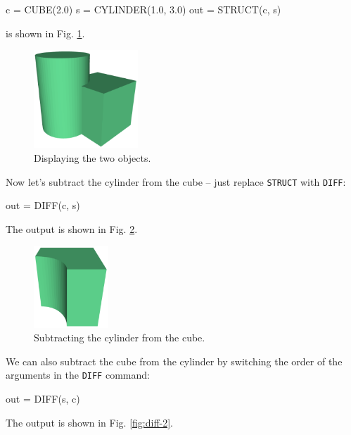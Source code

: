 \begin{bluecode}
c = CUBE(2.0)
s = CYLINDER(1.0, 3.0)
out = STRUCT(c, s) 
\end{bluecode}
is shown in Fig. \ref{fig:diff-0}.

\begin{figure}[!ht]
\begin{center}
\includegraphics[width=0.35\textwidth]{img/diff-0.png}
\end{center}
\vspace{-4mm}
\caption{Displaying the two objects.}
\label{fig:diff-0}
\end{figure}
\noindent
Now let's subtract the cylinder from the cube -- just replace 
{\tt STRUCT} with {\tt DIFF}:

\begin{bluecode}
out = DIFF(c, s) 
\end{bluecode}
The output is shown in Fig. \ref{fig:diff-1}.

\begin{figure}[!ht]
\begin{center}
\includegraphics[width=0.25\textwidth]{img/diff-1.png}
\end{center}
\vspace{-4mm}
\caption{Subtracting the cylinder from the cube.}
\label{fig:diff-1}
\end{figure}
\noindent
We can also subtract the cube from the cylinder by switching 
the order of the arguments in the {\tt DIFF} command:

\begin{bluecode}
out = DIFF(s, c) 
\end{bluecode}
The output is shown in Fig. \ref{fig:diff-2}.


